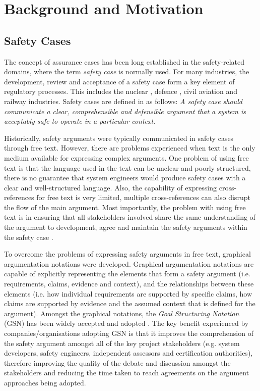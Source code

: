 \section{Background and Motivation}
\label{sec:background}

\subsection{Safety Cases}
The concept of assurance cases has been long established in the safety-related domains, where the term \textit{safety case} is normally used. 
For many industries, the development, review and acceptance of a safety case form a key element of regulatory processes. 
This includes the nuclear \cite{hse}, defence \cite{mod2007}, civil aviation \cite{caa2007} and railway \cite{yellowBook2007} industries. 
Safety cases are defined in \cite{kelly2004goal} as follows: \textit{A safety case should communicate a clear, comprehensible and defensible argument that a system is acceptably safe to operate in a particular context}. 

Historically, safety arguments were typically communicated in safety cases through free text. However, there are problems experienced when text is the only medium available for expressing complex arguments. 
One problem of using free text is that the language used in the text can be unclear and poorly structured, there is no guarantee that system engineers would produce safety cases with a clear and well-structured language. 
Also, the capability of expressing cross-references for free text is very limited, multiple cross-references can also disrupt the flow of the main argument. 
Most importantly, the problem with using free text is in ensuring that all stakeholders involved share the same understanding of the argument to development, agree and maintain the safety arguments within the safety case \cite{kelly2004goal}.

To overcome the problems of expressing safety arguments in free text, graphical argumentation notations were developed. 
Graphical argumentation notations are capable of explicitly representing the elements that form a safety argument (i.e. requirements, claims, evidence and context), and the relationships between these elements (i.e. how individual requirements are supported by specific claims, how claims are supported by evidence and the assumed context that is defined for the argument). 
Amongst the graphical notations, the \textit{Goal Structuring Notation} (GSN) \cite{kelly2004goal} has been widely accepted and adopted \cite{chinneck2004turning}. 
The key benefit experienced by companies/organisations adopting GSN is that it improves the comprehension of the safety argument amongst all of the key project stakeholders (e.g. system developers, safety engineers, independent assessors and certification authorities), therefore improving the quality of the debate and discussion amongst the stakeholders and reducing the time taken to reach agreements on the argument approaches being adopted.

